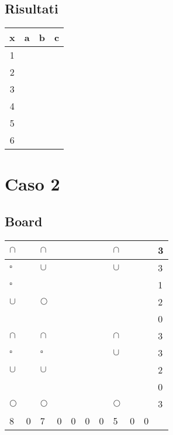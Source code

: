\documentclass[11pt]{article}
\begin{document}
\subsection{Risultati}
\begin{table}[H]
    \begin{tabular}{|c|c|c|c|}
    \hline
    x & a & b & c \\ \hline \hline
    1 &  &  &  \\ \hline
    2 &  &  &  \\ \hline
    3 &  &  &  \\ \hline
    4 &  &  &  \\ \hline
    5 &  &  &  \\ \hline
    6 &  &  &  \\ \hline
    \end{tabular}
\end{table}

\section{Caso 2}
\subsection{Board}
\begin{table}[H]
    \begin{tabular}{|l|l|l|l|l|l|l|l|l|l||l|}
    \hline
     $\cap$ &  & $\cap$ &  &  &  &  & $\cap$ &  &  & 3 \\ \hline
     $\square$ &  & $\cup$ &  &  &  &  & $\cup$ &  &  & 3 \\ \hline
     $\square$ &  &  &  &  &  &  &  &  &  & 1 \\ \hline
     $\cup$ &  & $\Circle$ &  &  &  &  &  &  &  & 2 \\ \hline
     &  &  &  &  &  &  &  &  &  & 0 \\ \hline
     $\cap$ &  & $\cap$ &  &  &  &  & $\cap$ &  &  & 3 \\ \hline
     $\square$ &  & $\square$ &  &  &  &  & $\cup$ &  &  & 3 \\ \hline
     $\cup$ &  & $\cup$ &  &  &  &  &  &  &  & 2 \\ \hline
     &  &  &  &  &  &  &  &  &  & 0 \\ \hline
     $\Circle$ &  & $\Circle$ &  &  &  &  & $\Circle$ &  &  & 3 \\ \hline \hline
     8 & 0 & 7 & 0 & 0 & 0 & 0 & 5 & 0 & 0 & \\ \hline
    \end{tabular}
\end{table}
\end{document}
